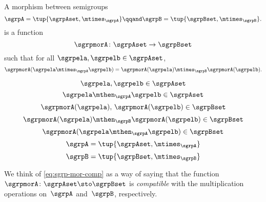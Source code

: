 

\section{\wHomos}

\begin{ctdefinition}
  \label{def:semigroup-mor}
   A morphism between semigroups
  \begin{equation}
  \sgrpA = \tup{\sgrpAset, \mtimes_\sgrpA}
   \qqand
   \sgrpB = \tup{\sgrpBset, \mtimes_\sgrpB}.
   \end{equation}
     is a function~
     \begin{equation}
     \sgrpmorA\colon \sgrpAset \to \sgrpBset
      \end{equation}
      such that for all $\sgrpela, \sgrpelb \in \sgrpAset$,
  \begin{equation}
    \label{eq:sgrp-mor-comp}
    \sgrpmorA(\sgrpela \mtimes_{\sgrpA} \sgrpelb) = \sgrpmorA (\sgrpela) \mtimes_{\sgrpB} \sgrpmorA(\sgrpelb).
  \end{equation}

\end{ctdefinition}

\begin{forslides}
\begin{equation}\label{eq:sgrslides_xy}
\sgrpela, \sgrpelb \in \sgrpAset
\end{equation}
\begin{equation}\label{eq:sgrslides_xty}
\sgrpela \mthen_\sgrpA \sgrpelb \in \sgrpAset
\end{equation}
\begin{equation}\label{eq:sgrslides_fxfy}
\sgrpmorA(\sgrpela),\, \sgrpmorA( \sgrpelb) \in \sgrpBset
\end{equation}
\begin{equation}\label{eq:sgrslides_fxtfy}
\sgrpmorA(\sgrpela) \mthen_\sgrpB \sgrpmorA(\sgrpelb) \in \sgrpBset
\end{equation}
\begin{equation}\label{eq:sgrslides_fxty}
\sgrpmorA(\sgrpela  \mthen_\sgrpA  \sgrpelb) \in \sgrpBset
\end{equation}
 \begin{equation}\label{eq:sgrpA}
  \sgrpA = \tup{\sgrpAset, \mtimes_\sgrpA}
   \end{equation}
   \begin{equation}\label{eq:sgrpB}
   \sgrpB = \tup{\sgrpBset, \mtimes_\sgrpB}
   \end{equation}
\end{forslides}
We think of   \cref{eq:sgrp-mor-comp} as a way of saying that the function~$\sgrpmorA\colon \sgrpAset \sto \sgrpBset$  is \emph{compatible} with the multiplication operations on~$\sgrpA$ and~$\sgrpB$, respectively.

